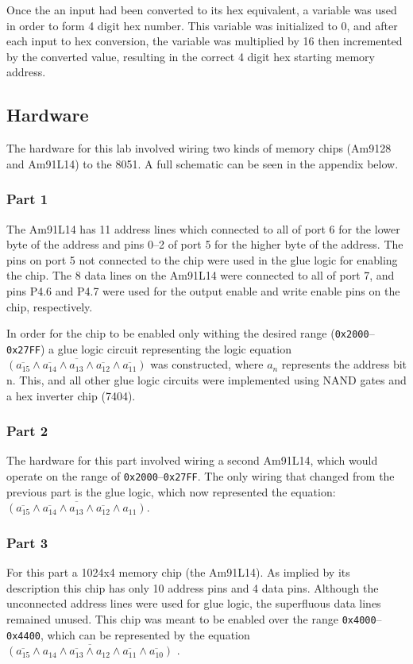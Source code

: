 \documentclass[12pt]{article}
\begin{document}
Once the an input had been converted to its hex equivalent, a variable was used in order to form 4 digit hex number. This variable was initialized to 0, and after each input to hex conversion, the variable was multiplied by 16 then incremented by the converted value, resulting in the correct 4 digit hex starting memory address. 

\subsection{Hardware}
The hardware for this lab involved wiring two kinds of memory chips (Am9128 and Am91L14) to the 8051. A full schematic can be seen in the appendix below.

\subsubsection{Part 1}
The Am91L14 has 11 address lines which connected to all of port 6 for the lower byte of the address and pins 0--2 of port 5 for the higher byte of the address. The pins on port 5 not connected to the chip were used in the glue logic for enabling the chip. The 8 data lines on the Am91L14 were connected to all of port 7, and pins P4.6 and P4.7 were used for the output enable and write enable pins on the chip, respectively. 

In order for the chip to be enabled only withing the desired range (\texttt{0x2000}--\texttt{0x27FF}) a glue logic circuit representing the logic equation $\overline{(\overline{a_{15}}\land\overline{a_{14}}\land a_{13}\land\overline{a_{12}}\land\overline{a_{11}})}$ was constructed, where $a_n$ represents the address bit n. This, and all other glue logic circuits were implemented using NAND gates and a hex inverter chip (7404).

\subsubsection{Part 2}
The hardware for this part involved wiring a second Am91L14, which would operate on the range of \texttt{0x2000}--\texttt{0x27FF}. The only wiring that changed from the previous part is the glue logic, which now represented the equation: $\overline{(\overline{a_{15}}\land\overline{a_{14}}\land a_{13}\land\overline{a_{12}}\land a_{11})}$.

\subsubsection{Part 3}
For this part a 1024x4 memory chip (the Am91L14). As implied by its description this chip has only 10 address pins and 4 data pins. Although the unconnected address lines were used for glue logic, the superfluous data lines remained unused. This chip was meant to be enabled over the range \texttt{0x4000}--\texttt{0x4400}, which can be represented by the equation  $\overline{(\overline{a_{15}}\land a_{14}\land \overline{a_{13}}\land a_{12}\land\overline{a_{11}}\land\overline{a_{10}})}$ .
\end{document}
